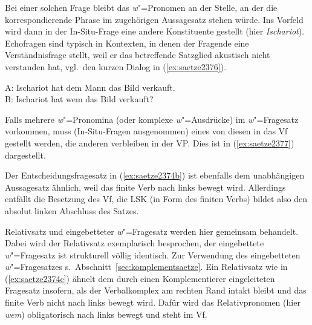 \begin{exe}
  \ex\label{ex:saetze2375}
  \begin{xlist}
  \end{xlist}
\end{exe}

Bei einer solchen Frage bleibt das \textit{w}"=Pronomen an der Stelle, an der die korrespondierende Phrase im zugehörigen Aussagesatz stehen würde.
Ins Vorfeld wird dann in der In-Situ-Frage eine andere Konstituente gestellt (hier \zB \textit{Ischariot}).
Echofragen sind typisch in Kontexten, in denen der Fragende eine Verständnisfrage stellt, weil er das betreffende Satzglied \zB akustisch nicht verstanden hat, vgl.\ den kurzen Dialog in (\ref{ex:saetze2376}).

\begin{exe}
  \ex\label{ex:saetze2376} A: Ischariot hat dem Mann das Bild verkauft.\\
  B: Ischariot hat wem das Bild verkauft?
\end{exe}

Falls mehrere \textit{w}"=Pronomina (oder komplexe \textit{w}"=Ausdrücke) im \textit{w}"=Fragesatz vorkommen, muss (In-Situ-Fragen ausgenommen) eines von diesen in das Vf gestellt werden, die anderen verbleiben in der VP.
Dies ist in (\ref{ex:saetze2377}) dargestellt.

\begin{exe}
  \ex\label{ex:saetze2377}
  \begin{xlist}
  \end{xlist}
\end{exe}

Der Entscheidungsfragesatz in (\ref{ex:saetze2374b}) ist ebenfalls dem unabhängigen Aussagesatz ähnlich, weil das finite Verb nach links bewegt wird.
Allerdings entfällt die Besetzung des Vf, die LSK (in Form des finiten Verbs) bildet also den absolut linken Abschluss des Satzes.


Relativsatz und eingebetteter \textit{w}"=Fragesatz werden hier gemeinsam behandelt.
Dabei wird der Relativsatz exemplarisch besprochen, der eingebettete \textit{w}"=Fragesatz ist strukturell völlig identisch.
Zur Verwendung des eingebetteten \textit{w}"=Fragesatzes s.\ Abschnitt~\ref{sec:komplementsaetze}.
Ein Relativsatz wie in (\ref{ex:saetze2374c}) ähnelt dem durch einen Komplementierer eingeleiteten Fragesatz insofern, als der Verbalkomplex am rechten Rand intakt bleibt und das finite Verb nicht nach links bewegt wird.
Dafür wird das Relativpronomen (hier \textit{wem}) obligatorisch nach links bewegt und steht im Vf.

